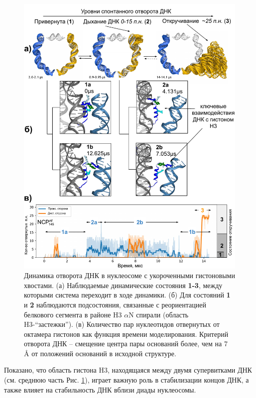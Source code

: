\begin{figure} [H]
    \centering
    \includegraphics[width=\textwidth]{images/p2/10ms/fig2_new.pdf}
    \caption[Динамика отворота ДНК в нуклеосоме с укороченными гистоновыми хвостами]{Динамика отворота ДНК в нуклеосоме с укороченными гистоновыми хвостами. (а) Наблюдаемые динамические состояния \textbf{1-3}, между которыми система переходит в ходе динамики. (б) Для состояний \textbf{1} и \textbf{2} наблюдаются подсостояния, связанные с реориентацией белкового сегмента в районе H3 $\alpha$N спирали (область H3-``застежки''). (в) Количество пар нуклеотидов отвернутых от октамера гистонов как функция времени моделирования. Критерий отворота ДНК  --  смещение центра пары оснований более, чем на 7 \AA{} от положений оснований в исходной структуре. }
    \label{fig:p2_3:f2}
\end{figure}


\noindent
Показано, что область гистона H3, находящаяся между двумя супервитками ДНК (см. среднюю часть Рис. \ref{fig:p2_3:f2}), играет важную роль в стабилизации концов ДНК, а также влияет на стабильность ДНК вблизи диады нуклеосомы.

